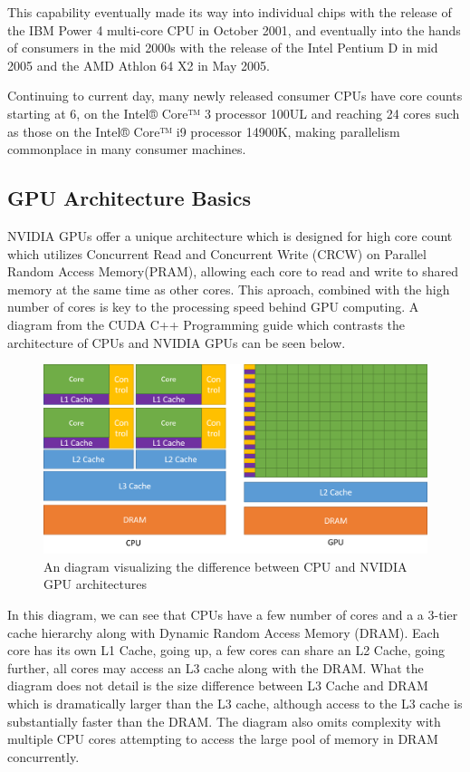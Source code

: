 \documentclass[11pt]{report}
\begin{document}
    This capability eventually made its way into individual chips with the release of the IBM Power 4 multi-core CPU in October 2001\cite{IBM_POWER4}, and eventually into the hands of consumers in the mid 2000s with the release of the Intel Pentium D in mid 2005 and the AMD Athlon 64 X2 in May 2005\cite{AMD_ATHLON64X2}\cite{INTEL_PENTIUMD}.

    Continuing to current day, many newly released consumer CPUs have core counts starting at 6, on the Intel® Core™ 3 processor 100UL\cite{INTEL_CORE3} and reaching 24 cores such as those on the Intel® Core™ i9 processor 14900K\cite{INTEL_14900K}, making parallelism commonplace in many consumer machines.

    
    
    \subsection{GPU Architecture Basics}
    NVIDIA GPUs offer a unique architecture which is designed for high core count which utilizes Concurrent Read and Concurrent Write (CRCW) on Parallel Random Access Memory(PRAM), allowing each core to read and write to shared memory at the same time as other cores. This aproach, combined with the high number of cores is key to the processing speed behind GPU computing. A diagram from the CUDA C++ Programming guide which contrasts the architecture of CPUs and NVIDIA GPUs can be seen below. 

    \begin{figure}[!h]
        \centering
        \includegraphics[width=\textwidth]{Images/gpu-devotes-more-transistors-to-data-processing.png}
        \caption{An diagram visualizing the difference between CPU and NVIDIA GPU architectures\cite{CPP_GUIDE}}
        \label{fig:enter-label}
    \end{figure}

    In this diagram, we can see that CPUs have a few number of cores and a a 3-tier cache hierarchy along with Dynamic Random Access Memory (DRAM). Each core has its own L1 Cache, going up, a few cores can share an L2 Cache, going further, all cores may access an L3 cache along with the DRAM. What the diagram does not detail is the size difference between L3 Cache and DRAM which is dramatically larger than the L3 cache, although access to the L3 cache is substantially faster than the DRAM. The diagram also omits complexity with multiple CPU cores attempting to access the large pool of memory in DRAM concurrently.
\end{document}

